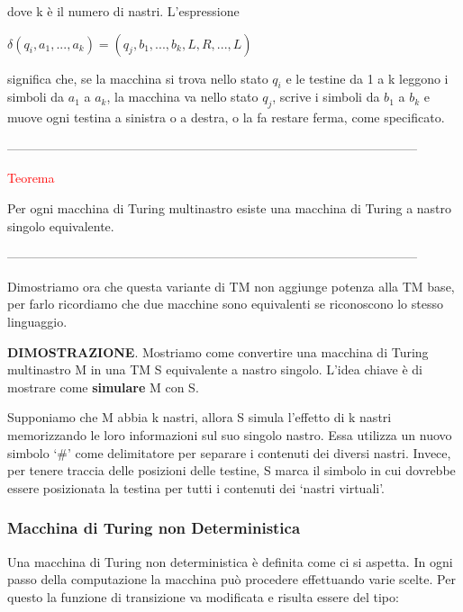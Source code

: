 \documentclass{article}
\begin{document}
dove k è il numero di nastri. L'espressione

\begin{center}
    $\delta(q_i, a_1, ..., a_k) = (q_j, b_1, ..., b_k, L, R, ..., L)$ 
\end{center}

significa che, se la macchina si trova nello stato $q_i$ e le testine da 1 a k
leggono i simboli da $a_1$ a $a_k$, la macchina va nello stato $q_j$, scrive i
simboli da $b_1$ a $b_k$ e muove ogni testina a sinistra o a destra, o la fa
restare ferma, come specificato.

\newpage

--------------------------------------------------------------------------------------------------

\begin{center}
    \textcolor{red}{Teorema}
\end{center}

Per ogni macchina di Turing multinastro esiste una macchina di Turing a nastro
singolo equivalente.

--------------------------------------------------------------------------------------------------

Dimostriamo ora che questa variante di TM non aggiunge potenza alla TM base, per
farlo ricordiamo che due macchine sono equivalenti se riconoscono lo stesso
linguaggio.

\textbf{DIMOSTRAZIONE}. Mostriamo come convertire una macchina di Turing
multinastro M in una TM S equivalente a nastro singolo. L'idea chiave è di
mostrare come \textbf{simulare} M con S.

Supponiamo che M abbia k nastri, allora S simula l'effetto di k nastri
memorizzando le loro informazioni sul suo singolo nastro. Essa utilizza un nuovo
simbolo `\#' come delimitatore per separare i contenuti dei diversi nastri.
Invece, per tenere traccia delle posizioni delle testine, S marca il simbolo in
cui dovrebbe essere posizionata la testina per tutti i contenuti dei `nastri
virtuali'.

\subsubsection{Macchina di Turing non Deterministica}

Una macchina di Turing non deterministica è definita come ci si aspetta. In ogni
passo della computazione la macchina può procedere effettuando varie scelte. Per
questo la funzione di transizione va modificata e risulta essere del tipo:
\end{document}
